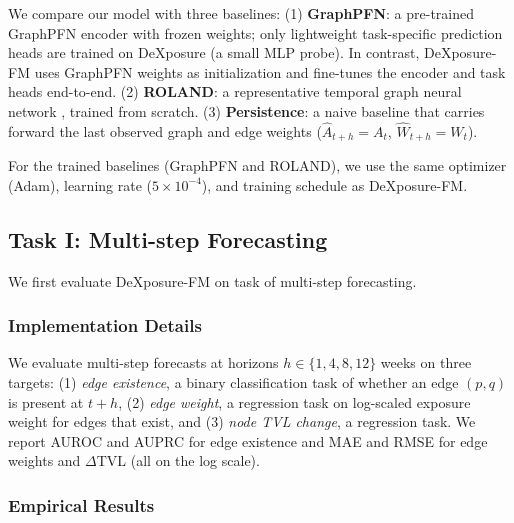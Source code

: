 We compare our model with three baselines:
(1) \textbf{GraphPFN}: a pre-trained GraphPFN encoder with frozen weights; only lightweight task-specific prediction heads are trained on DeXposure (a small MLP probe). In contrast, DeXposure-FM uses GraphPFN weights as initialization and fine-tunes the encoder and task heads end-to-end.
(2) \textbf{ROLAND}: a representative temporal graph neural network \citep{YouEtAl2022ROLAND}, trained from scratch.
(3) \textbf{Persistence}: a naive baseline that carries forward the last observed graph and edge weights ($\hat{A}_{t+h}=A_t$, $\hat{W}_{t+h}=W_t$).

For the trained baselines (GraphPFN and ROLAND), we use the same optimizer (Adam), learning rate ($5 \times 10^{-4}$), and training schedule as DeXposure-FM.

\subsection{Task I: Multi-step Forecasting}
\label{subsec:forecast}

We first evaluate DeXposure-FM on task of multi-step forecasting.

\subsubsection{Implementation Details}
\label{subsubsec:task1-impl}

We evaluate multi-step forecasts at horizons $h \in \{1,4,8,12\}$ weeks on three targets: (1) \emph{edge existence}, a binary classification task of whether an edge $(p,q)$ is present at $t+h$, (2) \emph{edge weight}, a regression task on log-scaled exposure weight for edges that exist, and (3) \emph{node TVL change}, a regression task. %
We report AUROC \citep{Fawcett2006ROC} and AUPRC \citep{DavisGoadrich2006PR} for edge existence and MAE and RMSE for edge weights and $\Delta$TVL (all on the log scale).

\subsubsection{Empirical Results}
\label{subsubsec:task1-results}

